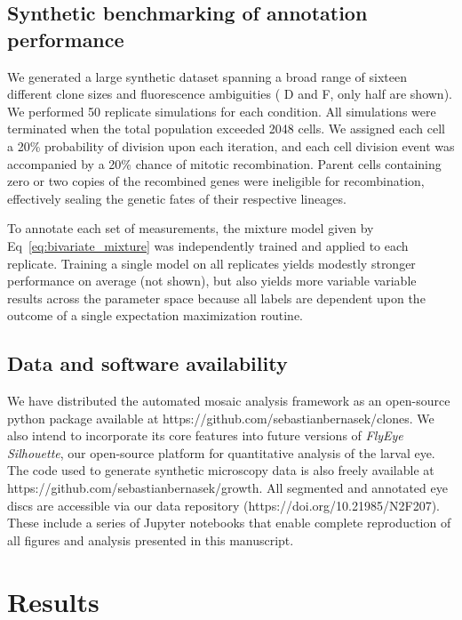 \documentclass[10pt,letterpaper]{article}
\begin{document}
\subsection*{Synthetic benchmarking of annotation performance}

We generated a large synthetic dataset spanning a broad range of sixteen different clone sizes and fluorescence ambiguities ( D and  F, only half are shown). We performed 50 replicate simulations for each condition. All simulations were terminated when the total population exceeded 2048 cells. We assigned each cell a 20\% probability of division upon each iteration, and each cell division event was accompanied by a 20\% chance of mitotic recombination. Parent cells containing zero or two copies of the recombined genes were ineligible for recombination, effectively sealing the genetic fates of their respective lineages. 

To annotate each set of measurements, the mixture model given by Eq~\ref{eq:bivariate_mixture} was independently trained and applied to each replicate. Training a single model on all replicates yields modestly stronger performance on average (not shown), but also yields more variable variable results across the parameter space because all labels are dependent upon the outcome of a single expectation maximization routine. 


\subsection*{Data and software availability}

We have distributed the automated mosaic analysis framework as an open-source python package available at https://github.com/sebastianbernasek/clones. We also intend to incorporate its core features into future versions of \textit{FlyEye Silhouette}, our open-source platform for quantitative analysis of the larval eye. The code used to generate synthetic microscopy data is also freely available at https://github.com/sebastianbernasek/growth. All segmented and annotated eye discs are accessible via our data repository (https://doi.org/10.21985/N2F207). These include a series of Jupyter notebooks that enable complete reproduction of all figures and analysis presented in this manuscript.



\section*{Results}
\end{document}
